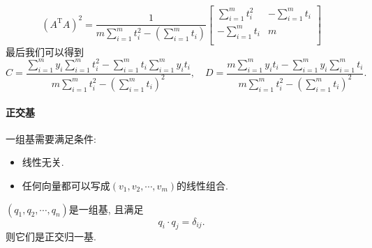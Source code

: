 \begin{equation}
  \left( A^{\mathrm{T}}A \right) ^{2}
  =
  \frac{1}{m \sum_{i=1}^{m} t_i^{2} - \left( \sum_{i=1}^{m} t_i \right) } \begin{bmatrix}
   \sum_{i=1}^{m} t_i^{2} & -\sum_{i=1}^{m} t_i\\
   -\sum_{i=1}^{m} t_i & m\\
  \end{bmatrix}
\end{equation}
最后我们可以得到
\begin{equation}
  C = \frac{\sum_{i=1}^{m} y_i \sum_{i=1}^{m} t_i^{2} - \sum_{i=1}^{m} t_i \sum_{i=1}^{m} y_i t_i}{m \sum_{i=1}^{m} t_i^{2} - \left( \sum_{i=1}^{m} t_i \right) ^{2}}
  ,\quad
  D = \frac{m\sum_{i=1}^{m} y_i t_i - \sum_{i=1}^{m} y_i \sum_{i=1}^{m} t_i}{m \sum_{i=1}^{m} t_i^{2} - \left( \sum_{i=1}^{m} t_i \right) ^{2}}.
\end{equation}

\paragraph{正交基}
一组基需要满足条件:
\begin{itemize}
    \item 线性无关.
    \item 任何向量都可以写成$\left( v_1,v_2,\cdots,v_m \right) $的线性组合.
\end{itemize}

\begin{definition}
    $\left( q_1,q_2,\cdots,q_n \right) $是一组基, 且满足
    \begin{equation}
      q_i \cdot q_j = \delta_{ij}.
    \end{equation}
    则它们是正交归一基.
\end{definition}

